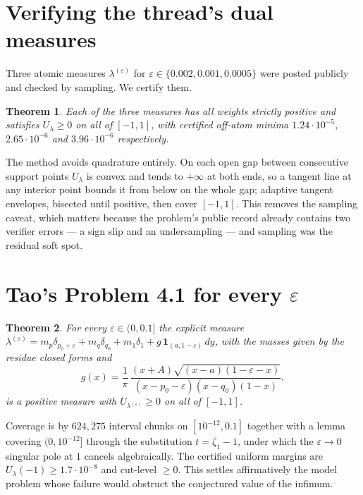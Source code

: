 \documentclass[11pt]{article}
\newtheorem{theorem}{Theorem}
\begin{document}
\section{Verifying the thread's dual measures}

Three atomic measures $\lambda^{(\varepsilon)}$ for
$\varepsilon\in\{0.002,0.001,0.0005\}$ were posted publicly and checked
by sampling. We certify them.

\begin{theorem}
Each of the three measures has all weights strictly positive and
satisfies $U_{\lambda}\ge 0$ on all of $[-1,1]$, with certified
off-atom minima $1.24\cdot10^{-5}$, $2.65\cdot10^{-6}$ and
$3.96\cdot10^{-6}$ respectively.
\end{theorem}

The method avoids quadrature entirely. On each open gap between
consecutive support points $U_\lambda$ is convex and tends to $+\infty$
at both ends, so a tangent line at any interior point bounds it from
below on the whole gap; adaptive tangent envelopes, bisected until
positive, then cover $[-1,1]$. This removes the sampling caveat, which
matters because the problem's public record already contains two
verifier errors --- a sign slip and an undersampling --- and sampling
was the residual soft spot.

\section{Tao's Problem 4.1 for every $\varepsilon$}

\begin{theorem}\label{thm:family}
For every $\varepsilon\in(0,0.1]$ the explicit measure
$\lambda^{(\varepsilon)} = m_p\delta_{p_0+\varepsilon} + m_q\delta_{q_0}
+ m_1\delta_1 + g\,\mathbf{1}_{(a,1-\varepsilon)}\,dy$, with the masses
given by the residue closed forms and
\[
  g(x)=\frac{1}{\pi}\,\frac{(x+A)\sqrt{(x-a)(1-\varepsilon-x)}}
  {(x-p_0-\varepsilon)(x-q_0)(1-x)},
\]
is a positive measure with $U_{\lambda^{(\varepsilon)}}\ge 0$ on all of
$[-1,1]$.
\end{theorem}

Coverage is by $624{,}275$ interval chunks on $[10^{-12},0.1]$ together
with a lemma covering $(0,10^{-12}]$ through the substitution
$t=\zeta_1-1$, under which the $\varepsilon\to0$ singular pole at $1$
cancels algebraically. The certified uniform margins are
$U_\lambda(-1)\ge 1.7\cdot10^{-8}$ and cut-level $\ge0$. This settles
affirmatively the model problem whose failure would obstruct the
conjectured value of the infimum.
\end{document}
